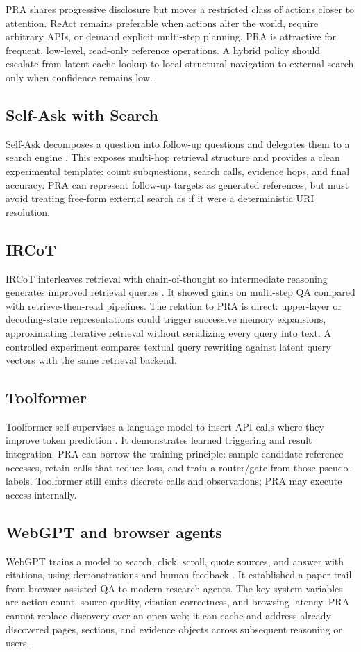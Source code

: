 \documentclass[10pt,a4paper]{article}
\begin{document}
PRA shares progressive disclosure but moves a restricted class of actions closer to attention. ReAct remains preferable when actions alter the world, require arbitrary APIs, or demand explicit multi-step planning. PRA is attractive for frequent, low-level, read-only reference operations. A hybrid policy should escalate from latent cache lookup to local structural navigation to external search only when confidence remains low.

\subsection{Self-Ask with Search}
Self-Ask decomposes a question into follow-up questions and delegates them to a search engine \citep{press2022selfask}. This exposes multi-hop retrieval structure and provides a clean experimental template: count subquestions, search calls, evidence hops, and final accuracy. PRA can represent follow-up targets as generated references, but must avoid treating free-form external search as if it were a deterministic URI resolution.

\subsection{IRCoT}
IRCoT interleaves retrieval with chain-of-thought so intermediate reasoning generates improved retrieval queries \citep{trivedi2023ircot}. It showed gains on multi-step QA compared with retrieve-then-read pipelines. The relation to PRA is direct: upper-layer or decoding-state representations could trigger successive memory expansions, approximating iterative retrieval without serializing every query into text. A controlled experiment compares textual query rewriting against latent query vectors with the same retrieval backend.

\subsection{Toolformer}
Toolformer self-supervises a language model to insert API calls where they improve token prediction \citep{schick2023toolformer}. It demonstrates learned triggering and result integration. PRA can borrow the training principle: sample candidate reference accesses, retain calls that reduce loss, and train a router/gate from those pseudo-labels. Toolformer still emits discrete calls and observations; PRA may execute access internally.

\subsection{WebGPT and browser agents}
WebGPT trains a model to search, click, scroll, quote sources, and answer with citations, using demonstrations and human feedback \citep{nakano2021webgpt}. It established a paper trail from browser-assisted QA to modern research agents. The key system variables are action count, source quality, citation correctness, and browsing latency. PRA cannot replace discovery over an open web; it can cache and address already discovered pages, sections, and evidence objects across subsequent reasoning or users.
\end{document}
